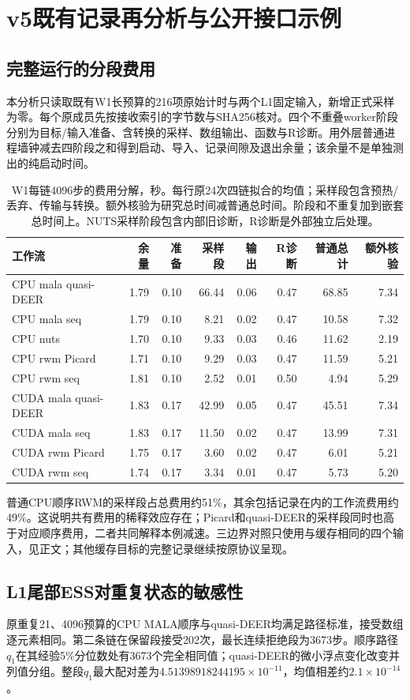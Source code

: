 \section{v5既有记录再分析与公开接口示例}
\subsection{完整运行的分段费用}
本分析只读取既有W1长预算的216项原始计时与两个L1固定输入，新增正式采样为零。每个原成员先按接收索引的字节数与SHA256核对。四个不重叠worker阶段分别为目标/输入准备、含转换的采样、数组输出、函数与R诊断。用外层普通进程墙钟减去四阶段之和得到启动、导入、记录间隙及退出余量；该余量不是单独测出的纯启动时间。
\begin{table}[htbp]\centering\footnotesize\setlength{\tabcolsep}{3pt}
\begin{tabular}{lrrrrrrr}\toprule
工作流 & 余量 & 准备 & 采样段 & 输出 & R诊断 & 普通总计 & 额外核验\\\midrule
CPU mala quasi-DEER & 1.79 & 0.10 & 66.44 & 0.06 & 0.47 & 68.85 & 7.34\\
CPU mala seq & 1.79 & 0.10 & 8.21 & 0.02 & 0.47 & 10.58 & 7.32\\
CPU nuts & 1.70 & 0.10 & 9.33 & 0.03 & 0.46 & 11.62 & 2.19\\
CPU rwm Picard & 1.71 & 0.10 & 9.29 & 0.03 & 0.47 & 11.59 & 5.21\\
CPU rwm seq & 1.81 & 0.10 & 2.52 & 0.01 & 0.50 & 4.94 & 5.29\\
CUDA mala quasi-DEER & 1.83 & 0.17 & 42.99 & 0.05 & 0.47 & 45.51 & 7.34\\
CUDA mala seq & 1.83 & 0.17 & 11.50 & 0.02 & 0.47 & 13.99 & 7.31\\
CUDA rwm Picard & 1.75 & 0.17 & 3.60 & 0.02 & 0.47 & 6.01 & 5.21\\
CUDA rwm seq & 1.74 & 0.17 & 3.34 & 0.01 & 0.47 & 5.73 & 5.20\\
\bottomrule\end{tabular}
\caption{W1每链4096步的费用分解，秒。每行原24次四链拟合的均值；采样段包含预热/丢弃、传输与转换。额外核验为研究总时间减普通总时间。阶段和不重复加到嵌套总时间上。NUTS采样阶段包含内部旧诊断，R诊断是外部独立后处理。}
\end{table}
普通CPU顺序RWM的采样段占总费用约51\%，其余包括记录在内的工作流费用约49\%。这说明共有费用的稀释效应存在；Picard和quasi-DEER的采样段同时也高于对应顺序费用，二者共同解释本例减速。三边界对照只使用与缓存相同的四个输入，见正文；其他缓存目标的完整记录继续按原协议呈现。

\subsection{L1尾部ESS对重复状态的敏感性}
原重复21、4096预算的CPU MALA顺序与quasi-DEER均满足路径标准，接受数组逐元素相同。第二条链在保留段接受202次，最长连续拒绝段为3673步。顺序路径$q_1$在其经验5\%分位数处有3673个完全相同值；quasi-DEER的微小浮点变化改变并列值分组。整段$q_1$最大配对差为$4.51398918244195\times10^{-11}$，均值相差约$2.1\times10^{-14}$。

